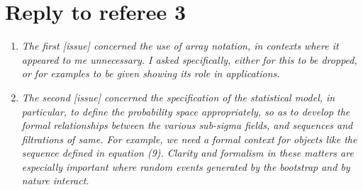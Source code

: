 \documentclass[12pt]{article}
\begin{document}
\section*{\hfill Reply to referee 3\hfill}

\begin{enumerate}
\item \textit{The first [issue] concerned the use of array notation,
    in contexts where it appeared to me unnecessary. I asked
    specifically, either for this to be dropped, or for examples to be
    given showing its role in applications.}

\item \textit{The second [issue] concerned the specification of the
    statistical model, in particular, to define the probability space
    appropriately, so as to develop the formal relationships between
    the various sub-sigma fields, and sequences and filtrations of
    same. For example, we need a formal context for objects like the
    sequence defined in equation (9). Clarity and formalism in these
    matters are especially important where random events generated by
    the bootstrap and by nature interact.}

\end{enumerate}
\end{document}

